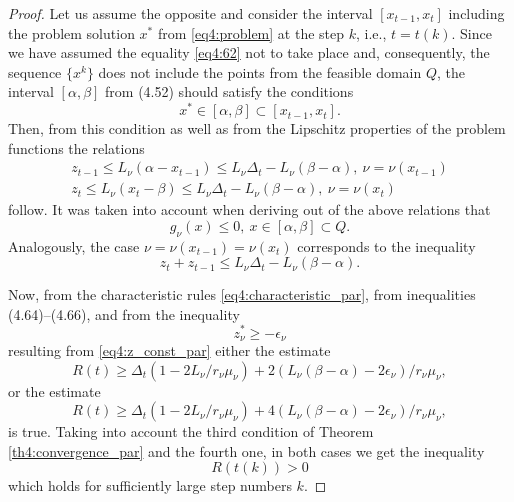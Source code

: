 \documentclass[graybox]{svmult}
\begin{document}
\begin{proof}
  Let us assume the opposite and consider the interval $[x_{t-1},x_t]$ including the problem solution $x^*$ from \eqref{eq4:problem} at the step $k$, i.e., $t=t(k)$. Since we have assumed the equality \eqref{eq4:62} not to take place and, consequently, the sequence $\{x^k\}$ does not include the points from the feasible domain $Q$, the interval $[\alpha,\beta]$ from (4.52) should satisfy the conditions
  \begin{equation}
    x^*\in [\alpha,\beta]\subset[x_{t-1}, x_t].
  \end{equation}
  Then, from this condition as well as from the Lipschitz properties of the problem functions the relations
  \begin{gather}
    z_{t-1}\le L_\nu(\alpha - x_{t-1})\le L_\nu\Delta_t-L_\nu(\beta-\alpha),\:\nu=\nu(x_{t-1}) \\
    z_t\le L_\nu(x_{t}-\beta)\le L_\nu\Delta_t-L_\nu(\beta-\alpha),\:\nu=\nu(x_{t})
  \end{gather}
  follow. It was taken into account when deriving out of the above relations that
  \begin{displaymath}
    g_\nu(x)\le 0,\: x\in[\alpha,\beta]\subset Q.
  \end{displaymath}
  Analogously, the case $\nu=\nu(x_{t-1})=\nu(x_t)$ corresponds to the inequality
  \begin{equation}
    z_t+z_{t-1}\le L_\nu \Delta_t - L_\nu(\beta-\alpha).
  \end{equation}

  Now, from the characteristic rules \eqref{eq4:characteristic_par}, from inequalities (4.64)–(4.66), and from the inequality
  \begin{displaymath}
    z^*_\nu\ge-\epsilon_\nu
  \end{displaymath}
  resulting from \eqref{eq4:z_const_par} either the estimate
  \begin{displaymath}
    R(t)\ge\Delta_t(1-2L_\nu/r_\nu\mu_\nu)+2(L_\nu(\beta-\alpha)-2\epsilon_\nu)/r_\nu\mu_\nu,
  \end{displaymath}
  or the estimate
  \begin{displaymath}
    R(t)\ge\Delta_t(1-2L_\nu/r_\nu\mu_\nu)+4(L_\nu(\beta-\alpha)-2\epsilon_\nu)/r_\nu\mu_\nu,
  \end{displaymath}
  is true. Taking into account the third condition of Theorem \ref{th4:convergence_par} and the fourth one, in both cases we get the inequality
  \begin{equation}
    R(t(k))>0
  \end{equation}
  which holds for sufficiently large step numbers $k$.


\end{proof}
\end{document}
